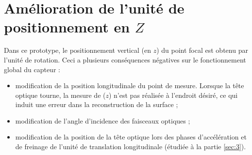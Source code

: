 \section{Amélioration de l’unité de positionnement en $Z$}
\ifprof
\else
Dans ce prototype, le positionnement vertical (en $z$) du point focal est obtenu par l’unité de rotation. Ceci a
plusieurs conséquences négatives sur le fonctionnement global du capteur :
\begin{itemize}
\item modification de la position longitudinale du point de mesure. Lorsque la tête optique tourne, la
mesure de ($z$) n’est pas réalisée à l’endroit désiré, ce qui induit une erreur dans la reconstruction de
la surface ;
\item modification de l’angle d’incidence des faisceaux optiques ;
\item modification de la position de la tête optique lors des phases d’accélération et de freinage de l’unité
de translation longitudinale (étudiée à la partie \ref{sec:3}).
\end{itemize}
\fi

